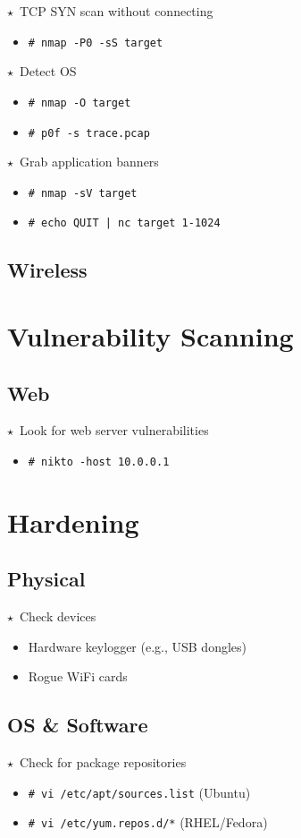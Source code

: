 \documentclass[10pt,landscape]{article}
\newcommand{\os}[1]{\texttt{\footnotesize{#1}}}
\newcommand{\unix}{\os{U}}
\newcommand{\linux}{\os{L}}
\newenvironment{action}[1]
  {\begin{minipage}[c]{\linewidth}$\star$~#1\begin{itemize}[leftmargin=1cm]}
  {\end{itemize}\end{minipage}\vspace*{3pt}}
\newcommand{\cmd}[2]{\item[#1] {\small\tt\# #2}}
\newcommand{\comment}[1]{\textrm{\small(#1)}}
\newcommand{\bulletpoint}[1]{\item {\small #1}}
\begin{document}
\begin{multicols*}{3}
\begin{action}{TCP SYN scan without connecting}
\cmd{\unix}{nmap -P0 -sS target}
\end{action}

\begin{action}{Detect OS}
\cmd{\unix}{nmap -O target}
\cmd{\unix}{p0f -s trace.pcap}
\end{action}

\begin{action}{Grab application banners}
\cmd{\unix}{nmap -sV target}
\cmd{\unix}{echo QUIT | nc target 1-1024}
\end{action}

\subsection*{Wireless}

\section*{Vulnerability Scanning}

\subsection*{Web}
\begin{action}{Look for web server vulnerabilities}
\cmd{\unix}{nikto -host 10.0.0.1}
\end{action}

\section*{Hardening}

\subsection*{Physical}

\begin{action}{Check devices}
\bulletpoint{Hardware keylogger (e.g., USB dongles)}
\bulletpoint{Rogue WiFi cards}
\end{action}

\subsection*{OS \& Software}

\begin{action}{Check for package repositories}
  \cmd{\linux}{vi /etc/apt/sources.list} \comment{Ubuntu}
  \cmd{\linux}{vi /etc/yum.repos.d/*} \comment{RHEL/Fedora}
\end{action}


\end{multicols*}
\end{document}
